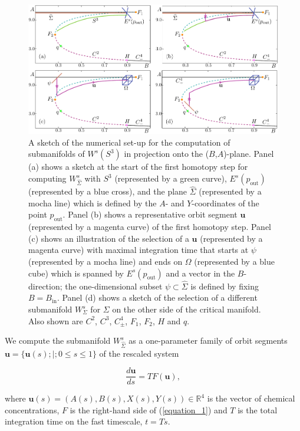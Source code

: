 \documentclass{ws-ijbc}
\begin{document}
\begin{figure}[h]
\centering
\includegraphics[]{./figures/MKMO_3.pdf}
\caption{A sketch of the numerical set-up for the computation of submanifolds of $W^s(S^3)$ in projection onto the ($B$,$A$)-plane.  Panel (a) shows a sketch at the start of the first homotopy step for computing $W^{s}_{\widehat{\Sigma}}$ with $S^3$ (represented by a green curve), $E^s(p_{\text{out}})$ (represented by a blue cross), and the plane $\widehat{\Sigma}$ (represented by a mocha line) which is defined by the $A$- and $Y$-coordinates of the point $p_{\text{out}}$.  Panel (b) shows a representative orbit segment $\mathbf{u}$ (represented by a magenta curve) of the first homotopy step.  Panel (c) shows an illustration of the selection of a $\mathbf{u}$ (represented by a magenta curve) with maximal integration time that starts at $\psi$ (represented by a mocha line) and ends on $\Omega$ (represented by a blue cube) which is spanned by $E^s(p_{\text{out}})$ and a vector in the $B$-direction; the one-dimensional subset $\psi \subset \widehat{\Sigma}$ is defined by fixing $B = B_{\text{in}}$.  Panel (d) shows a sketch of the selection of a different submanifold $W^{s}_{\Sigma}$ for $\Sigma$ on the other side of the critical manifold.  Also shown are $C^2$, $C^3$, $C^4_\pm$, $F_1$, $F_2$, $H$ and $q$.}
\label{figure_3}
\end{figure}


We compute the submanifold $W^s_{\widehat{\Sigma}}$ as a one-parameter family of orbit segments $\mathbf{u} = \{\mathbf{u}(s) ;|; 0 \leq s \leq 1 \}$ of the rescaled system

\begin{equation}
\frac{d\mathbf{u}}{ds} = TF(\mathbf{u}),
\label{equation_4}
\end{equation}
    
\noindent
where $\mathbf{u}(s) = (A(s), B(s), X(s), Y(s)) \in \mathbb{R}^4$ is the vector of chemical concentrations, $F$ is the right-hand side of (\ref{equation_1}) and $T$ is the total integration time on the fast timescale, $t=Ts$.
    
\end{document}
